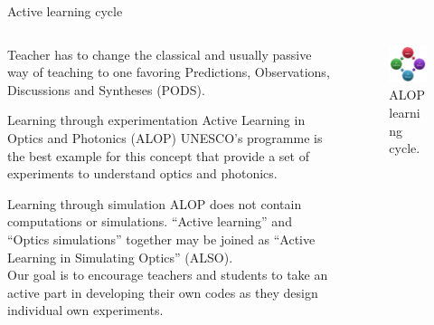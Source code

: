 \documentclass[9pt]{beamer}
\begin{document}
\begin{frame}{Active learning cycle}
	\begin{columns}[c]
		\begin{column}{0.6\textwidth}
				Teacher has to change the classical and usually passive way of teaching to one favoring Predictions, Observations, Discussions and Syntheses (PODS).
				
				
		\begin{exampleblock}{Learning through experimentation}
			Active Learning in Optics and Photonics (ALOP) UNESCO’s programme is the best example for this concept that provide a set of experiments to understand optics and photonics.
		\end{exampleblock}
		\begin{alertblock}{Learning through simulation}
			ALOP does not contain computations or simulations. “Active learning” and “Optics simulations” together may be joined as “Active Learning in Simulating Optics” (ALSO).\\
			Our goal is to encourage teachers and students to take an active part in developing their own codes as they design individual own experiments.\\
			
		\end{alertblock}
		\end{column}
		\begin{column}{0.4\textwidth}
			\begin{figure}
				\includegraphics[width=\linewidth]{images/alop_cycle}
				\caption{ALOP learning cycle.}
			\end{figure}
		\end{column}
	\end{columns}
		
\end{frame}
\end{document}
